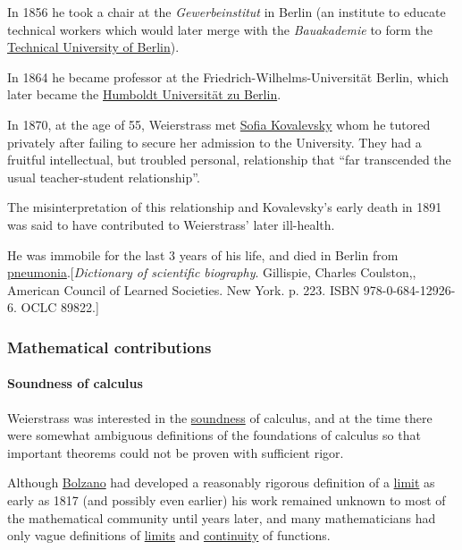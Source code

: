 \documentclass{article}
\begin{document}
In 1856 he took a chair at the \textit{Gewerbeinstitut} in Berlin (an institute to educate technical workers which would later merge with the \textit{Bauakademie} to form the \href{https://en.wikipedia.org/wiki/Technical_University_of_Berlin}{Technical University of Berlin}).

In 1864 he became professor at the Friedrich-Wilhelms-Universität Berlin, which later became the \href{https://en.wikipedia.org/wiki/Humboldt_University_of_Berlin}{Humboldt Universität zu Berlin}.

%
In 1870, at the age of 55, Weierstrass met \href{https://en.wikipedia.org/wiki/Sofia_Kovalevskaya}{Sofia Kovalevsky} whom he tutored privately after failing to secure her admission to the University.
They had a fruitful intellectual, but troubled personal, relationship that ``far transcended the usual teacher-student relationship''.

The misinterpretation of this relationship and Kovalevsky's early death in 1891 was said to have contributed to Weierstrass' later ill-health.

He was immobile for the last 3 years of his life, and died in Berlin from \href{https://en.wikipedia.org/wiki/Pneumonia}{pneumonia}.[\textit{Dictionary of scientific biography}. Gillispie, Charles Coulston,, American Council of Learned Societies. New York. p. 223. ISBN 978-0-684-12926-6. OCLC 89822.]

\subsubsection{Mathematical contributions}

\paragraph{Soundness of calculus}
Weierstrass was interested in the \href{https://en.wikipedia.org/wiki/Soundness}{soundness} of calculus, and at the time there were somewhat ambiguous definitions of the foundations of calculus so that important theorems could not be proven with sufficient rigor.

Although \href{https://en.wikipedia.org/wiki/Bernard_Bolzano}{Bolzano} had developed a reasonably rigorous definition of a \href{https://en.wikipedia.org/wiki/Limit_of_a_function}{limit} as early as 1817 (and possibly even earlier) his work remained unknown to most of the mathematical community until years later, and many mathematicians had only vague definitions of \href{https://en.wikipedia.org/wiki/Limit_of_a_function}{limits} and \href{https://en.wikipedia.org/wiki/Continuous_function}{continuity} of functions.
\end{document}
